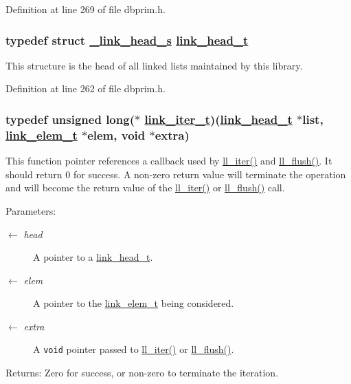 Definition at line 269 of file dbprim.h.\hypertarget{group__dbprim__link_ga0}{
\subsubsection[link\_\-head\_\-t]{\setlength{\rightskip}{0pt plus 5cm}typedef struct \hyperlink{struct__link__head__s}{\_\-link\_\-head\_\-s} \hyperlink{struct__link__head__s}{link\_\-head\_\-t}}}
\label{group__dbprim__link_ga0}


This structure is the head of all linked lists maintained by this library.

Definition at line 262 of file dbprim.h.\hypertarget{group__dbprim__link_ga2}{
\subsubsection[link\_\-iter\_\-t]{\setlength{\rightskip}{0pt plus 5cm}typedef unsigned long($\ast$ \hyperlink{group__dbprim__link_ga2}{link\_\-iter\_\-t})(\hyperlink{struct__link__head__s}{link\_\-head\_\-t} $\ast$list, \hyperlink{struct__link__elem__s}{link\_\-elem\_\-t} $\ast$elem, void $\ast$extra)}}
\label{group__dbprim__link_ga2}


This function pointer references a callback used by \hyperlink{group__dbprim__link_ga10}{ll\_\-iter()} and \hyperlink{group__dbprim__link_ga11}{ll\_\-flush()}. It should return 0 for success. A non-zero return value will terminate the operation and will become the return value of the \hyperlink{group__dbprim__link_ga10}{ll\_\-iter()} or \hyperlink{group__dbprim__link_ga11}{ll\_\-flush()} call.

\begin{Desc}
\item[Parameters:]
\begin{description}
\item[\mbox{$\leftarrow$} {\em head}]A pointer to a \hyperlink{group__dbprim__link_ga0}{link\_\-head\_\-t}. \item[\mbox{$\leftarrow$} {\em elem}]A pointer to the \hyperlink{group__dbprim__link_ga1}{link\_\-elem\_\-t} being considered. \item[\mbox{$\leftarrow$} {\em extra}]A {\tt void} pointer passed to \hyperlink{group__dbprim__link_ga10}{ll\_\-iter()} or \hyperlink{group__dbprim__link_ga11}{ll\_\-flush()}.\end{description}
\end{Desc}
\begin{Desc}
\item[Returns:]Zero for success, or non-zero to terminate the iteration.\end{Desc}


